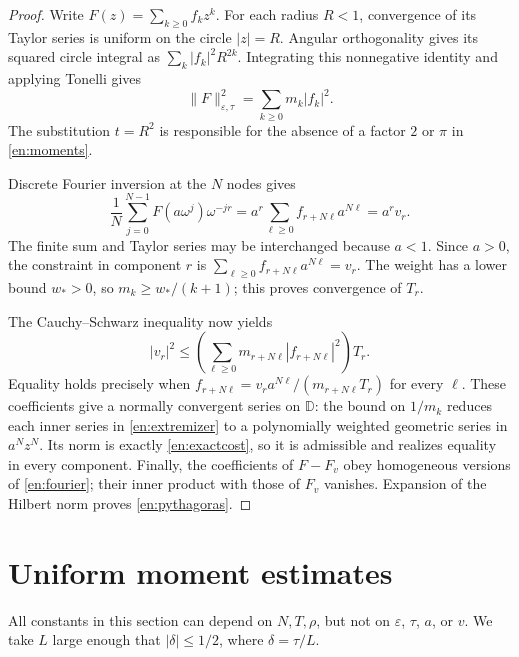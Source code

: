 \documentclass[12pt]{amsart}
\theoremstyle{definition}
\theoremstyle{remark}
\numberwithin{equation}{section}
\newcommand{\D}{\mathbb{D}}
\theoremstyle{definition}
\begin{document}
\begin{proof}
Write $F(z)=\sum_{k\ge0}f_kz^k$. For each radius $R<1$, convergence
of its Taylor series is uniform on the circle $|z|=R$. Angular
orthogonality gives its squared circle integral as
$\sum_k|f_k|^2R^{2k}$. Integrating this nonnegative identity and applying
Tonelli gives
\begin{equation}\label{en:parseval}
 \|F\|_{\varepsilon,\tau}^2=\sum_{k\ge0}m_k|f_k|^2.
\end{equation}
The substitution $t=R^2$ is responsible for the absence of a factor
$2$ or $\pi$ in \eqref{en:moments}.

Discrete Fourier inversion at the $N$ nodes gives
\begin{equation}\label{en:fourier}
 \frac1N\sum_{j=0}^{N-1}F(a\omega^j)\omega^{-jr}
 =a^r\sum_{\ell\ge0}f_{r+N\ell}a^{N\ell}=a^rv_r.
\end{equation}
The finite sum and Taylor series may be interchanged because $a<1$.
Since $a>0$, the constraint in component $r$ is
$\sum_{\ell\ge0}f_{r+N\ell}a^{N\ell}=v_r$.
The weight has a lower bound $w_*>0$, so $m_k\ge w_* /(k+1)$;
this proves convergence of $T_r$.

The Cauchy--Schwarz inequality now yields
\[
 |v_r|^2\le
 \left(\sum_{\ell\ge0}m_{r+N\ell}|f_{r+N\ell}|^2\right)T_r.
\]
Equality holds precisely when
$f_{r+N\ell}=v_ra^{N\ell}/(m_{r+N\ell}T_r)$ for every $\ell$.
These coefficients give a normally convergent series on $\D$:
the bound on $1/m_k$ reduces each inner series in
\eqref{en:extremizer} to a polynomially weighted geometric series
in $a^Nz^N$. Its norm is exactly \eqref{en:exactcost}, so it is
admissible and realizes equality in every component. Finally, the
coefficients of $F-F_v$ obey homogeneous versions of
\eqref{en:fourier}; their inner product with those of $F_v$ vanishes.
Expansion of the Hilbert norm proves \eqref{en:pythagoras}.
\end{proof}

\section{Uniform moment estimates}
All constants in this section can depend on $N,T,\rho$, but not on
$\varepsilon$, $\tau$, $a$, or $v$. We take $L$ large enough that
$|\delta|\le1/2$, where $\delta=\tau/L$.
\end{document}
